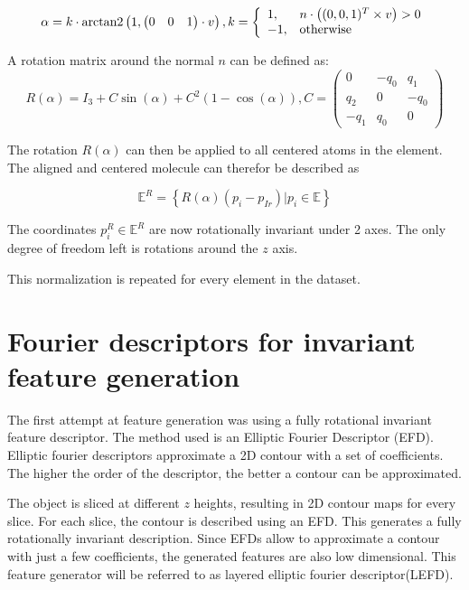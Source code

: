 $$ 
\alpha = k \cdot \operatorname{arctan2} \left( 1,  
\begin{pmatrix} 0 &  0 & 1 \end{pmatrix} \cdot v \right),\space k = \left\{\begin{array}{ll} 1, & n \cdot \left( (0,0,1)^T \times v \right) > 0 \\
  -1, & \text{otherwise}\end{array}\right.
$$

A rotation matrix around the normal $n$ can be defined as:
$$
R(\alpha) = I_3 + C \sin(\alpha) + C^2(1 - \cos(\alpha)), C =
\begin{pmatrix}
  0 & -q_0 & q_1 \\
  q_2 & 0 & -q_0\\
  -q_1 & q_0 & 0
\end{pmatrix}
$$


The rotation $R(\alpha)$ can then be applied to all centered atoms in the element.
The aligned and centered molecule can therefor be described as

$$ 
\mathbb{E}^R = \left\{ R(\alpha) (p_i - p_{Ir}) |  p_i \in \mathbb{E} \right\}
$$

The coordinates $p^R_i \in \mathbb{E}^R$ are now rotationally invariant under 2 axes. 
The only degree of freedom left is rotations around the $z$ axis. 

This normalization is repeated for every element in the dataset.





\newpage
\section{Fourier descriptors for invariant feature generation}

The first attempt at feature generation was using a fully rotational invariant feature descriptor.
The method used is an Elliptic Fourier Descriptor (EFD).
Elliptic fourier descriptors approximate a 2D contour with a set of coefficients.
The higher the order of the descriptor, the better a contour can be approximated.

The object is sliced at different $z$ heights, resulting in 2D contour maps for every slice.
For each slice, the contour is described using an EFD.
This generates a fully rotationally invariant description.
Since EFDs allow to approximate a contour with just a few coefficients, the generated features
are also low dimensional.
This feature generator will be referred to as layered elliptic fourier descriptor(LEFD).

